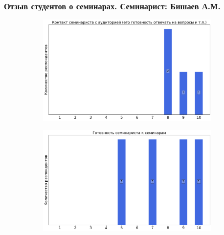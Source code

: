         
    \subsubsection{Отзыв студентов о семинарах. Семинарист: Бишаев А.М.}
		\begin{figure}[H]
			\centering
			\begin{subfigure}[b]{0.45\textwidth}
				\centering
				\includegraphics[width=\textwidth]{images/2 course/Кратные интегралы и теория поля/seminarists-marks-Бишаев А.М.-0.png}
			\end{subfigure}
			\begin{subfigure}[b]{0.45\textwidth}
				\centering
				\includegraphics[width=\textwidth]{images/2 course/Кратные интегралы и теория поля/seminarists-marks-Бишаев А.М.-1.png}
			\end{subfigure}
			\begin{subfigure}[b]{0.45\textwidth}
				\centering

\end{subfigure}
\end{figure}
